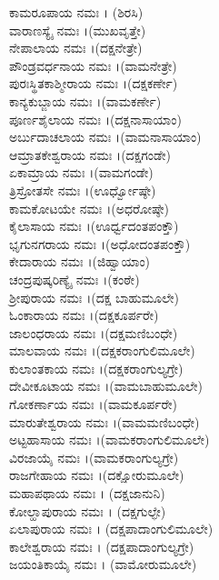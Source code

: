  ಕಾಮರೂಪಾಯ ನಮಃ । (ಶಿರಸಿ)\\
 ವಾರಾಣಸ್ಯೈ ನಮಃ ।(ಮುಖವೃತ್ತೇ)\\
 ನೇಪಾಲಾಯ ನಮಃ ।(ದಕ್ಷನೇತ್ರೇ)\\
 ಪೌಂಡ್ರವರ್ಧನಾಯ ನಮಃ ।(ವಾಮನೇತ್ರೇ)\\
 ಪುರಃಸ್ಥಿತಕಾಶ್ಮೀರಾಯ ನಮಃ ।(ದಕ್ಷಕರ್ಣೇ)\\
 ಕಾನ್ಯಕುಬ್ಜಾಯ ನಮಃ ।(ವಾಮಕರ್ಣೇ)\\
 ಪೂರ್ಣಶೈಲಾಯ ನಮಃ ।(ದಕ್ಷನಾಸಾಯಾಂ)\\
 ಅರ್ಬುದಾಚಲಾಯ ನಮಃ ।(ವಾಮನಾಸಾಯಾಂ)\\
 ಆಮ್ರಾತಕೇಶ್ವರಾಯ ನಮಃ ।(ದಕ್ಷಗಂಡೇ)\\
 ಏಕಾಮ್ರಾಯ ನಮಃ ।(ವಾಮಗಂಡೇ)\\
 ತ್ರಿಸ್ರೋತಸೇ ನಮಃ ।(ಊರ್ಧ್ವೋಷ್ಠೇ)\\
 ಕಾಮಕೋಟಯೇ ನಮಃ ।(ಅಧರೋಷ್ಠೇ)\\
 ಕೈಲಾಸಾಯ ನಮಃ ।(ಊರ್ಧ್ವದಂತಪಂಕ್ತೌ)\\
 ಭೃಗುನಗರಾಯ ನಮಃ ।(ಅಧೋದಂತಪಂಕ್ತೌ)\\
 ಕೇದಾರಾಯ ನಮಃ ।(ಜಿಹ್ವಾಯಾಂ)\\
 ಚಂದ್ರಪುಷ್ಕರಿಣ್ಯೈ ನಮಃ ।(ಕಂಠೇ)\\
 ಶ್ರೀಪುರಾಯ ನಮಃ ।(ದಕ್ಷ ಬಾಹುಮೂಲೇ)\\
 ಓಂಕಾರಾಯ ನಮಃ ।(ದಕ್ಷಕೂರ್ಪರೇ)\\
 ಜಾಲಂಧರಾಯ ನಮಃ ।(ದಕ್ಷಮಣಿಬಂಧೇ)\\
 ಮಾಲವಾಯ ನಮಃ ।(ದಕ್ಷಕರಾಂಗುಲಿಮೂಲೇ)\\
 ಕುಲಾಂತಕಾಯ ನಮಃ ।(ದಕ್ಷಕರಾಂಗುಲ್ಯಗ್ರೇ)\\
 ದೇವೀಕೂಟಾಯ ನಮಃ ।(ವಾಮಬಾಹುಮೂಲೇ)\\
 ಗೋಕರ್ಣಾಯ ನಮಃ ।(ವಾಮಕೂರ್ಪರೇ)\\
 ಮಾರುತೇಶ್ವರಾಯ ನಮಃ ।(ವಾಮಮಣಿಬಂಧೇ)\\
 ಅಟ್ಟಹಾಸಾಯ ನಮಃ ।(ವಾಮಕರಾಂಗುಲಿಮೂಲೇ)\\
 ವಿರಜಾಯೈ ನಮಃ ।(ವಾಮಕರಾಂಗುಲ್ಯಗ್ರೇ)\\
 ರಾಜಗೇಹಾಯ ನಮಃ ।(ದಕ್ಷೋರುಮೂಲೇ)\\
 ಮಹಾಪಥಾಯ ನಮಃ । (ದಕ್ಷಜಾನುನಿ)\\
 ಕೋಲ್ಹಾಪುರಾಯ ನಮಃ । (ದಕ್ಷಗುಲ್ಫೇ)\\
 ಏಲಾಪುರಾಯ ನಮಃ । (ದಕ್ಷಪಾದಾಂಗುಲಿಮೂಲೇ)\\
 ಕಾಲೇಶ್ವರಾಯ ನಮಃ । (ದಕ್ಷಪಾದಾಂಗುಲ್ಯಗ್ರೇ)\\
 ಜಯಂತಿಕಾಯೈ ನಮಃ । (ವಾಮೋರುಮೂಲೇ)\\
